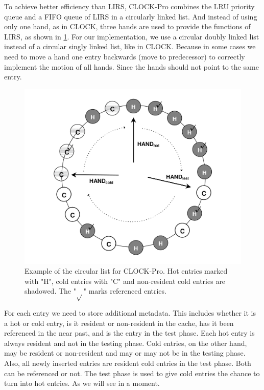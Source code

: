 \documentclass[
	12pt,
	a4paper,
	abstract,
	bibliography=totoc,
	chapterprefix,
	headings=openright,
	numbers=endperiod,
	parskip=half,
	twoside,
]{scrreprt}
\begin{document}
To achieve better efficiency than LIRS, CLOCK-Pro combines the LRU priority queue and a FIFO queue of LIRS in a circularly linked list.
And instead of using only one hand, as in CLOCK, three hands are used to provide the functions of LIRS, 
as shown in \cref{fig:clock in clock-pro}.
For our implementation, we use a circular doubly linked list instead of a circular singly linked list, like in CLOCK.
Because in some cases we need to move a hand one entry backwards (move to predecessor) to correctly implement the motion of all hands.
Since the hands should not point to the same entry.

\begin{figure}[ht]
	\centering
	\includegraphics[scale=0.2]{clock_pro.png}
	\caption{Example of the circular list for CLOCK-Pro. Hot entries marked with "H", cold entries with "C" and non-resident cold entries are shadowed.
	The "$\sqrt{}$" marks referenced entries.}
		\label{fig:clock in clock-pro}
\end{figure}

For each entry we need to store additional metadata. This includes whether it is a hot or cold entry, 
is it resident or non-resident in the cache, has it been referenced in the near past, and is the entry in the test phase.
Each hot entry is always resident and not in the testing phase.
Cold entries, on the other hand, may be resident or non-resident and may or may not be in the testing phase.
Also, all newly inserted entries are resident cold entries in the test phase.
Both can be referenced or not.
The test phase is used to give cold entries the chance to turn into hot entries.
As we will see in a moment.
\end{document}
